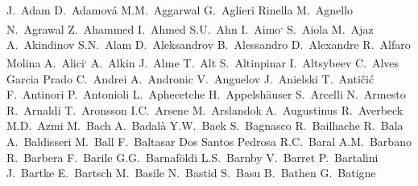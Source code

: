 


\begingroup
\small
\begin{flushleft}
J.~Adam\And
D.~Adamov\'{a}\And
M.M.~Aggarwal\And
G.~Aglieri Rinella\And
M.~Agnello\And
N.~Agrawal\And
Z.~Ahammed\And
I.~Ahmed\And
S.U.~Ahn\And
I.~Aimo\textsuperscript{,}\And
S.~Aiola\And
M.~Ajaz\And
A.~Akindinov\And
S.N.~Alam\And
D.~Aleksandrov\And
B.~Alessandro\And
D.~Alexandre\And
R.~Alfaro Molina\And
A.~Alici\textsuperscript{,}\And
A.~Alkin\And
J.~Alme\And
T.~Alt\And
S.~Altinpinar\And
I.~Altsybeev\And
C.~Alves Garcia Prado\And
C.~Andrei\And
A.~Andronic\And
V.~Anguelov\And
J.~Anielski\And
T.~Anti\v{c}i\'{c}\And
F.~Antinori\And
P.~Antonioli\And
L.~Aphecetche\And
H.~Appelsh\"{a}user\And
S.~Arcelli\And
N.~Armesto\And
R.~Arnaldi\And
T.~Aronsson\And
I.C.~Arsene\And
M.~Arslandok\And
A.~Augustinus\And
R.~Averbeck\And
M.D.~Azmi\And
M.~Bach\And
A.~Badal\`{a}\And
Y.W.~Baek\And
S.~Bagnasco\And
R.~Bailhache\And
R.~Bala\And
A.~Baldisseri\And
M.~Ball\And
F.~Baltasar Dos Santos Pedrosa\And
R.C.~Baral\And
A.M.~Barbano\And
R.~Barbera\And
F.~Barile\And
G.G.~Barnaf\"{o}ldi\And
L.S.~Barnby\And
V.~Barret\And
P.~Bartalini\And
J.~Bartke\And
E.~Bartsch\And
M.~Basile\And
N.~Bastid\And
S.~Basu\And
B.~Bathen\And
G.~Batigne\And

\end{flushleft}
